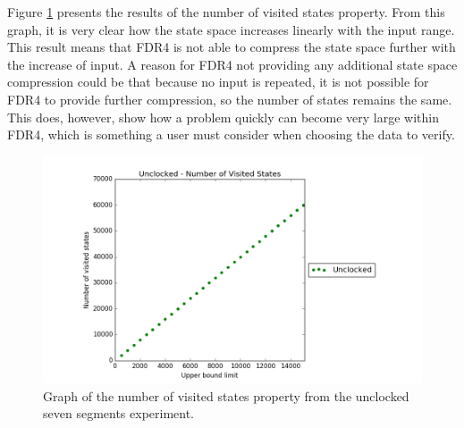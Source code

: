 Figure \ref{fig:unclocked_states} presents the results of the number of visited states property. From this graph, it is very clear how the state space increases linearly with the input range. This result means that FDR4 is not able to compress the state space further with the increase of input. A reason for FDR4 not providing any additional state space compression could be that because no input is repeated, it is not possible for FDR4 to provide further compression, so the number of states remains the same. This does, however, show how a problem quickly can become very large within FDR4, which is something a user must consider when choosing the data to verify.
\begin{figure}
    \centering
    \includegraphics[scale=0.6]{./figures/plots/unclocked_states.png}
\caption{Graph of the number of visited states property from the unclocked seven segments experiment.}
\label{fig:unclocked_states}
\end{figure}
